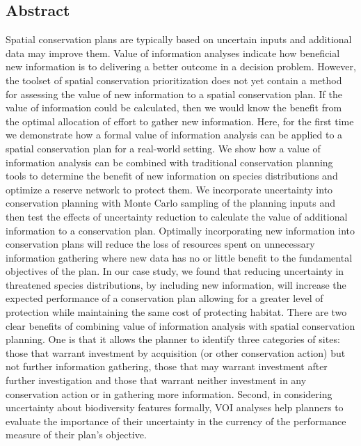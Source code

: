 \clearpage
\subsection*{Abstract}\label{abstract}

Spatial conservation plans are typically based on uncertain inputs and additional data may improve them. Value of information analyses indicate how beneficial new information is to delivering a better outcome in a decision problem. However, the toolset of spatial conservation prioritization does not yet contain a method for assessing the value of new information to a spatial conservation plan. If the value of information could be calculated, then we would know the benefit from the optimal allocation of effort to gather new information. Here, for the first time we demonstrate how a formal value of information analysis can be applied to a spatial conservation plan for a real-world setting. We show how a value of information analysis can be combined with traditional conservation planning tools to determine the benefit of new information on species distributions and optimize a reserve network to protect them. We incorporate uncertainty into conservation planning with Monte Carlo sampling of the planning inputs and then test the effects of uncertainty reduction to calculate the value of additional information to a conservation plan. Optimally incorporating new information into conservation plans will reduce the loss of resources spent on unnecessary information gathering where new data has no or little benefit to the fundamental objectives of the plan. In our case study, we found that reducing uncertainty in threatened species distributions, by including new information, will increase the expected performance of a conservation plan allowing for a greater level of protection while maintaining the same cost of protecting habitat. There are two clear benefits of combining value of information analysis with spatial conservation planning. One is that it allows the planner to identify three categories of sites: those that warrant investment by acquisition (or other conservation action) but not further information gathering, those that may warrant investment after further investigation and those that warrant neither investment in any conservation action or in gathering more information. Second, in considering uncertainty about biodiversity features formally, VOI analyses help planners to evaluate the importance of their uncertainty in the currency of the performance measure of their plan's objective.
